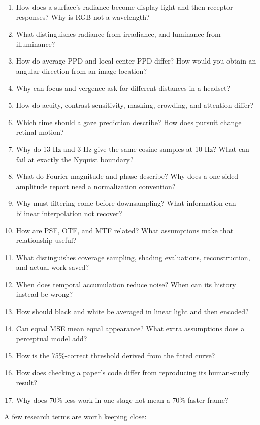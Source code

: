 \begin{enumerate}
\def\labelenumi{\arabic{enumi}.}
\tightlist
\item
  How does a surface's radiance become display light and then receptor responses? Why is RGB not a wavelength?
\item
  What distinguishes radiance from irradiance, and luminance from illuminance?
\item
  How do average PPD and local center PPD differ? How would you obtain an angular direction from an image location?
\item
  Why can focus and vergence ask for different distances in a headset?
\item
  How do acuity, contrast sensitivity, masking, crowding, and attention differ?
\item
  Which time should a gaze prediction describe? How does pursuit change retinal motion?
\item
  Why do 13 Hz and 3 Hz give the same cosine samples at 10 Hz? What can fail at exactly the Nyquist boundary?
\item
  What do Fourier magnitude and phase describe? Why does a one-sided amplitude report need a normalization convention?
\item
  Why must filtering come before downsampling? What information can bilinear interpolation not recover?
\item
  How are PSF, OTF, and MTF related? What assumptions make that relationship useful?
\item
  What distinguishes coverage sampling, shading evaluations, reconstruction, and actual work saved?
\item
  When does temporal accumulation reduce noise? When can its history instead be wrong?
\item
  How should black and white be averaged in linear light and then encoded?
\item
  Can equal MSE mean equal appearance? What extra assumptions does a perceptual model add?
\item
  How is the 75\%-correct threshold derived from the fitted curve?
\item
  How does checking a paper's code differ from reproducing its human-study result?
\item
  Why does 70\% less work in one stage not mean a 70\% faster frame?
\end{enumerate}

A few research terms are worth keeping close:

